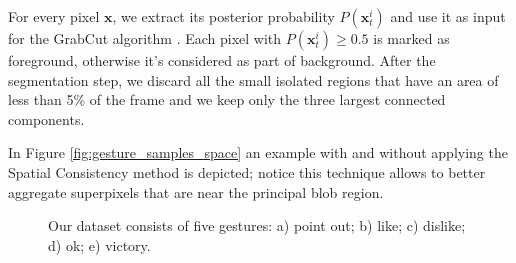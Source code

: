 For every pixel $\mathbf{x}$, we extract its posterior probability $P(\mathbf{x}_{t}^{i})$ and use it as input for the GrabCut algorithm \cite{rother04}. Each pixel with $P(\mathbf{x}_{t}^{i}) \geq 0.5$ is marked as foreground, otherwise it's considered as part of background. After the segmentation step, we discard all the small isolated regions that have an area of less than 5\% of the frame and we keep only the three largest connected components.

In Figure \ref{fig:gesture_samples_space} an example with and without applying the Spatial Consistency method is depicted; notice this technique allows to better aggregate superpixels that are near the principal blob region.


\begin{figure}[tb]
\centering
{}
\caption{Our dataset consists of five gestures: a) point out; b) like; c) dislike; d) ok; e) victory.}
\label{fig:gesture_samples}
\end{figure}

